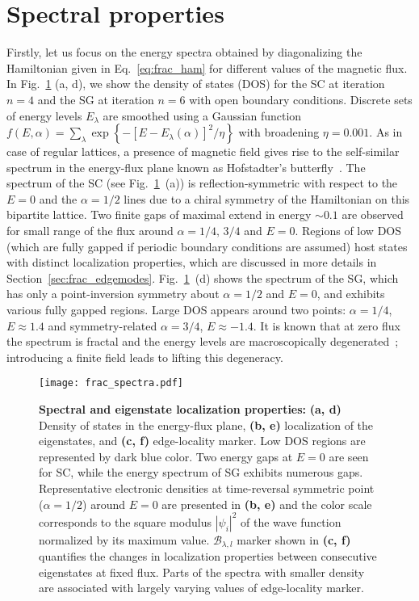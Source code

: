 {\section{Spectral properties}
\label{sec:frac_spectral}
Firstly, let us focus on the energy spectra obtained by diagonalizing the Hamiltonian given in Eq.~\eqref{eq:frac_ham} for different values of the magnetic flux. In Fig.~\ref{fig:frac_spect} (a, d), we show the density of states (DOS) for the SC at iteration $n = 4$ and the SG at iteration $n = 6$ with open boundary conditions. Discrete sets of energy levels $E_\lambda$ are smoothed using a Gaussian function $f(E, \alpha) = \sum_{\lambda} \exp  \left\{ - \left[ E - E_{\lambda} (\alpha) \right]^2 / \eta \right\}$ with broadening $\eta = 0.001$. As in case of regular lattices, a presence of magnetic field gives rise to the self-similar spectrum in the energy-flux plane known as Hofstadter's butterfly~\cite{1976:Hofstadter}. The spectrum of the SC (see Fig.~\ref{fig:frac_spect}~(a)) is reflection-symmetric with respect to the $E = 0$ and the $\alpha = 1/2$ lines due to a chiral symmetry of the Hamiltonian on this bipartite lattice. Two finite gaps of maximal extend in energy $\sim 0.1$ are observed for small range of the flux around $\alpha = 1/4, \, 3/4$ and $E = 0$. Regions of low DOS (which are fully gapped if periodic boundary conditions are assumed) host states with distinct localization properties, which are discussed in more details in Section~\ref{sec:frac_edgemodes}. Fig.~\ref{fig:frac_spect}~(d) shows the spectrum of the SG, which has only a point-inversion symmetry about $\alpha=1/2$ and $E=0$, and exhibits various fully gapped regions. Large DOS appears around two points: $\alpha = 1/4$, $E \approx 1.4$ and symmetry-related $\alpha = 3/4$, $E \approx -1.4$. It is known that at zero flux the spectrum is fractal and the energy levels are macroscopically degenerated~\cite{PhysRevB.28.3110}; introducing a finite field leads to lifting this degeneracy.

\begin{figure}[H]
\centering
\texttt{[image: frac\_spectra.pdf]} 
\caption{\textbf{Spectral and eigenstate localization properties:} \textbf{(a, d)} Density of states in the energy-flux plane, \textbf{(b, e)} localization of the eigenstates, and \textbf{(c, f)} edge-locality marker. Low DOS regions are represented by dark blue color. Two energy gaps at $E = 0$ are seen for SC, while the energy spectrum of SG exhibits numerous gaps. Representative electronic densities at time-reversal symmetric point ($\alpha = 1/2$) around $E = 0$ are presented in \textbf{(b, e)} and the color scale corresponds to the square modulus $| \psi_i|^2$ of the wave function normalized by its maximum value. $\mathcal{B}_{\lambda, l}$ marker shown in \textbf{(c, f)} quantifies the changes in localization properties between consecutive eigenstates at fixed flux. Parts of the spectra with smaller density are associated with largely varying values of edge-locality marker.}
\label{fig:frac_spect}
\end{figure}


}
